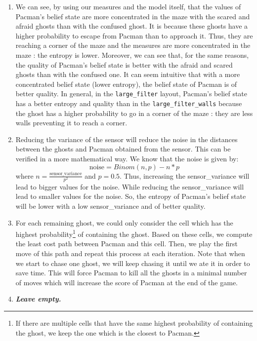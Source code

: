\documentclass{article}
\begin{document}
\begin{enumerate}[label=\alph*.,leftmargin=*]
    \item We can see, by using our measures and the model itself, that the values of Pacman's belief state are more concentrated in the maze with the scared and afraid ghosts than with the confused ghost. It is because these ghosts have a higher probability to escape from Pacman than to approach it. Thus, they are reaching a corner of the maze and the measures are more concentrated in the maze : the entropy is lower.
    Moreover, we can see that, for the same reasons, the quality of Pacman's belief state is better with the afraid and scared ghosts than with the confused one. It can seem intuitive that with a more concentrated belief state (lower entropy), the belief state of Pacman is of better quality. In general, in the \texttt{large\_filter} layout, Pacman's belief state has a better entropy and quality than in the \texttt{large\_filter\_walls} because the ghost has a higher probability to go in a corner of the maze : they are less walls preventing it to reach a corner.
    \item Reducing the variance of the sensor will reduce the noise in the distances between the ghosts and Pacman obtained from the sensor. This can be verified in a more mathematical way. We know that the noise is given by: $$\text{noise} = Binom(n, p) - n * p$$
    where $n = \frac{\text{sensor\_variance}}{p^2}$ and $p = 0.5$. Thus, increasing the sensor\_variance will lead to bigger values for the noise. While reducing the sensor\_variance will lead to smaller values for the noise. So, the entropy of Pacman's belief state will be lower with a low sensor\_variance and of better quality.
    
    \item For each remaining ghost, we could only consider the cell which has the highest probability\footnote{If there are multiple cells that have the same highest probability of containing the ghost, we keep the one which is the closest to Pacman.} of containing the ghost. Based on these cells, we compute the least cost path between Pacman and this cell. Then, we play the first move of this path and repeat this process at each iteration. Note that when we start to chase one ghost, we will keep chasing it until we ate it in order to save time. This will force Pacman to kill all the ghosts in a minimal number of moves which will increase the score of Pacman at the end of the game.
    \item \textbf{\textit{Leave empty.}}
\end{enumerate}

\end{document}
